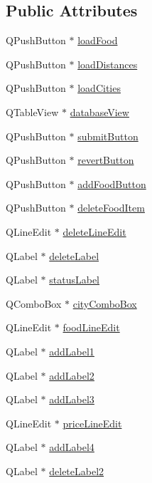 \subsection*{Public Attributes}
\begin{DoxyCompactItemize}
\item 
Q\+Push\+Button $\ast$ \mbox{\hyperlink{class_ui___edit_window_ab9d413027aade0148ee2d2a6be407ee3}{load\+Food}}
\item 
Q\+Push\+Button $\ast$ \mbox{\hyperlink{class_ui___edit_window_a7964ea67dfb4854ce61aa3ab4455163b}{load\+Distances}}
\item 
Q\+Push\+Button $\ast$ \mbox{\hyperlink{class_ui___edit_window_a72e481aba83e14845f40aea1fc15907d}{load\+Cities}}
\item 
Q\+Table\+View $\ast$ \mbox{\hyperlink{class_ui___edit_window_abc08309be18778796f46843dbcdd58aa}{database\+View}}
\item 
Q\+Push\+Button $\ast$ \mbox{\hyperlink{class_ui___edit_window_acb1a4bc3d3ca7ac89aadec3fd0d8136e}{submit\+Button}}
\item 
Q\+Push\+Button $\ast$ \mbox{\hyperlink{class_ui___edit_window_ac050e1e897d7586d3fd1504d4c45e583}{revert\+Button}}
\item 
Q\+Push\+Button $\ast$ \mbox{\hyperlink{class_ui___edit_window_ac0250d2255010e11592872eca299ac43}{add\+Food\+Button}}
\item 
Q\+Push\+Button $\ast$ \mbox{\hyperlink{class_ui___edit_window_a0ceb7dd8d1a35dce88540f11a5fa3781}{delete\+Food\+Item}}
\item 
Q\+Line\+Edit $\ast$ \mbox{\hyperlink{class_ui___edit_window_a896becd8435c7e7f23437d3a88c9f37a}{delete\+Line\+Edit}}
\item 
Q\+Label $\ast$ \mbox{\hyperlink{class_ui___edit_window_ad7f3972df8a0de18c5c9a4599a7155b7}{delete\+Label}}
\item 
Q\+Label $\ast$ \mbox{\hyperlink{class_ui___edit_window_a61a44e2741b05b30c57597099dc8287e}{status\+Label}}
\item 
Q\+Combo\+Box $\ast$ \mbox{\hyperlink{class_ui___edit_window_aa2303bdddb5ab57d70c6845cb43a57de}{city\+Combo\+Box}}
\item 
Q\+Line\+Edit $\ast$ \mbox{\hyperlink{class_ui___edit_window_a91f59d2a7596e50d39d77156600390f8}{food\+Line\+Edit}}
\item 
Q\+Label $\ast$ \mbox{\hyperlink{class_ui___edit_window_af36575a5e2c6679fbf0b19576389af48}{add\+Label1}}
\item 
Q\+Label $\ast$ \mbox{\hyperlink{class_ui___edit_window_aa9f219198fa1933fb8bc3a51128b39dc}{add\+Label2}}
\item 
Q\+Label $\ast$ \mbox{\hyperlink{class_ui___edit_window_a51f0f2f4524fc6fa8ba30104abd68536}{add\+Label3}}
\item 
Q\+Line\+Edit $\ast$ \mbox{\hyperlink{class_ui___edit_window_a3e0cd71f9f53e7908adc5e1f3ac0e7eb}{price\+Line\+Edit}}
\item 
Q\+Label $\ast$ \mbox{\hyperlink{class_ui___edit_window_aeac115d010ec9cd47fc5799112d1bd95}{add\+Label4}}
\item 
Q\+Label $\ast$ \mbox{\hyperlink{class_ui___edit_window_a0b303529db668de46cf0bbb23e59bb46}{delete\+Label2}}
\end{DoxyCompactItemize}


